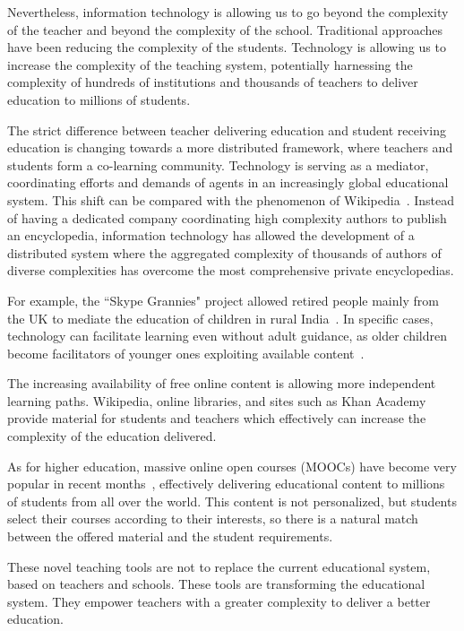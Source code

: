 \documentclass[12pt]{article}
\begin{document}
Nevertheless, information technology is allowing us to go beyond the complexity of the teacher and beyond the complexity of the school. 
 Traditional approaches have been reducing the complexity of the students. Technology is allowing us to increase the complexity of the teaching system, potentially harnessing the complexity of hundreds of institutions and thousands of teachers to deliver education to millions of students.




The strict difference between teacher delivering education and student receiving education is changing towards a more distributed framework, where teachers and students form a co-learning community. Technology is serving as a mediator, coordinating efforts and demands of agents in an increasingly global educational system. This shift can be compared with the phenomenon of Wikipedia~\cite{Wikipedia}. Instead of having a dedicated company coordinating high complexity authors to publish an encyclopedia, information technology has allowed the development of a distributed system where the aggregated complexity of thousands of authors of diverse complexities has overcome the most comprehensive private encyclopedias.

For example, the ``Skype Grannies" project allowed retired people mainly from the UK to mediate the education of children in rural India~\cite{Clark2011SkypeGrannies}. In specific cases, technology can facilitate learning even without adult guidance, as older children become facilitators of younger ones exploiting available content~\cite{mitra2005holeInTheWall}.

The increasing availability of free online content is allowing more independent learning paths. Wikipedia, online libraries, and sites such as Khan Academy~\cite{KhanAcademy} provide material for students and teachers which effectively can increase the complexity of the education delivered.

As for higher education, massive online open courses (MOOCs) have become very popular in recent months~\cite{pappano2012year}, effectively delivering educational content to millions of students from all over the world. This content is not personalized, but students select their courses according to their interests, so there is a natural match between the offered material and the student requirements.

These novel teaching tools are not to replace the current educational system, based on teachers and schools. These tools are transforming the educational system. They empower teachers with a greater complexity to deliver a better education.
\end{document}
